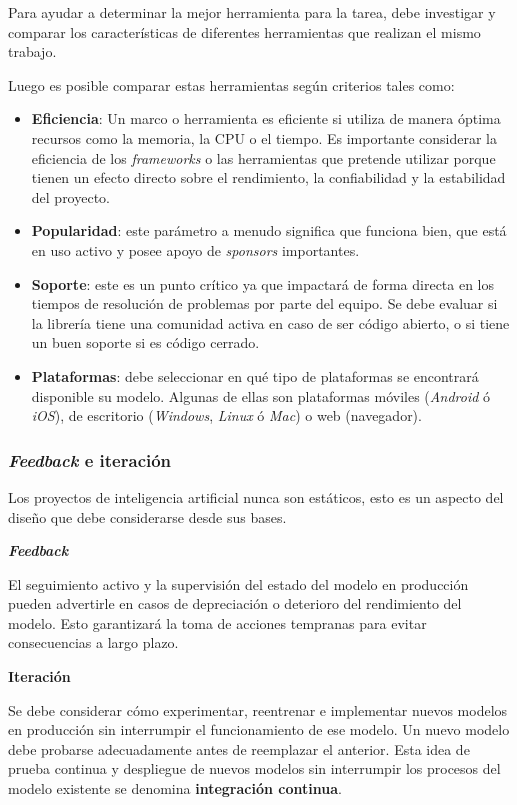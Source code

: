 \documentclass[a4paper,12pt]{article}
\begin{document}
		Para ayudar a determinar la mejor herramienta para la tarea, debe investigar y comparar los características de diferentes herramientas que realizan el mismo trabajo. 
		
		Luego es posible comparar estas herramientas según criterios tales como:
		\begin{itemize}[noitemsep, topsep=2pt]
			\item \textbf{Eficiencia}: Un marco o herramienta es eficiente si utiliza de manera óptima recursos como la memoria, la CPU o el tiempo. Es importante considerar la eficiencia de los \textit{frameworks} o las herramientas que pretende utilizar porque tienen un efecto directo sobre el rendimiento, la confiabilidad y la estabilidad del proyecto.
			\item \textbf{Popularidad}: este parámetro a menudo significa que funciona bien, que está en uso activo y posee apoyo de \textit{sponsors} importantes.
			\item \textbf{Soporte}: este es un punto crítico ya que impactará de forma directa en los tiempos de resolución de problemas por parte del equipo. Se debe evaluar si la librería tiene una comunidad activa en caso de ser código abierto, o si tiene un buen soporte si es código cerrado.
			\item \textbf{Plataformas}: debe seleccionar en qué tipo de plataformas se encontrará disponible su modelo. Algunas de ellas son plataformas móviles (\textit{Android} ó \textit{iOS}), de escritorio (\textit{Windows}, \textit{Linux} ó \textit{Mac}) o web (navegador).
		\end{itemize}
				
		\subsubsection{\textit{Feedback} e iteración}
		Los proyectos de inteligencia artificial nunca son estáticos, esto es un aspecto del diseño que debe considerarse desde sus bases.
		
		\textbf{\textit{Feedback}}
		
		El seguimiento activo y la supervisión del estado del modelo en producción pueden advertirle en casos de depreciación o deterioro del rendimiento del modelo. Esto garantizará la toma de acciones tempranas para evitar consecuencias a largo plazo.
		
		\textbf{Iteración}
		
		Se debe considerar cómo experimentar, reentrenar e implementar nuevos modelos en producción sin interrumpir el funcionamiento de ese modelo. Un nuevo modelo debe probarse adecuadamente antes de reemplazar el anterior. Esta idea de prueba continua y despliegue de nuevos modelos sin interrumpir los procesos del modelo existente se denomina \textbf{integración continua}.
		
\end{document}
